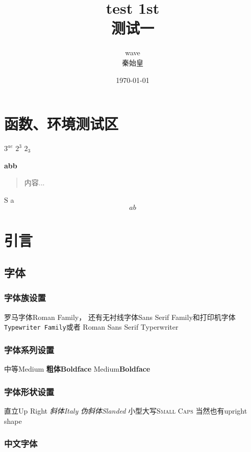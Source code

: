 \documentclass[10pt]{ctexart}%
\title{test 1st\\\heiti 测试一}
\author{wave\\\kaishu 秦始皇}
\date{\today}%
\newcommand{\shangbiao}[2]{$#1^{#2}$}
\newcommand{\biao}[3][^]{$#2#1#3$}
\newenvironment{myabstract}[1][摘要]
{\small 
\begin{center}
	\bfseries #1
\end{center} 
\begin{quotation}}{\end{quotation}}
\begin{document}
	\maketitle
	\tableofcontents%
	\section{函数、环境测试区}
	\shangbiao{3}{ae}
	\biao{2}{3}
	\biao[_]{2}{3}
	\begin{myabstract}[abb]
		内容...
	\end{myabstract}
    $\mathrm{S}$
a\[ab\]



	\section{引言}
	\subsection{字体}
	\subsubsection{字体族设置}
	
	罗马字体\textrm{Roman Family}，
	还有无衬线字体\textsf{Sans Serif Family}和打印机字体\texttt{Typewriter Family}或者
	\rmfamily%
	Roman
	\sffamily
	Sans Serif
	\ttfamily
	Typerwriter
	
	\subsubsection{字体系列设置}
	
	\rmfamily
	\textmd{中等Medium}
	\textbf{粗体Boldface}
	{\mdseries Medium}{\bfseries Boldface}%
	
	\subsubsection{字体形状设置}
	
	\textup{直立Up Right}
	\textit{斜体Italy}
	\textsl{伪斜体Slanded}
	\textsc{小型大写Small Caps}
	当然也有\upshape upright shape
	
	\subsubsection{中文字体}
	
\end{document}
